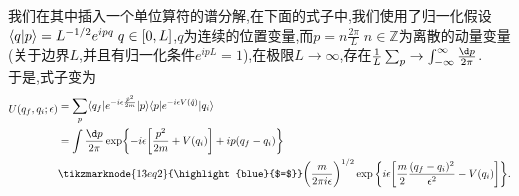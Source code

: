 我们在其中插入一个单位算符的谱分解,在下面的式子中,我们使用了归一化假设$\langle q|p\rangle=L^{-1/2}e^{ipq}\;q\in[0,L]$,$ q $为连续的位置变量,而$p=n\frac{2\pi}L\;n\in \mathbb Z$为离散的动量变量(关于边界$ L $,并且有归一化条件$e^{ipL}=1$),在极限$L\to\infty$,存在$\frac1L\sum_p\to\int_{-\infty}^\infty\frac{\d p}{2\pi}$.\\
于是,式子变为
\begin{equation}
    \vspace{\baselineskip}
    \begin{aligned}
        U(q_f,q_i;\epsilon)& \begin{aligned}&=\sum_p\langle q_f|e^{-i\epsilon\frac{\hat{p}^2}{2m}}|p\rangle\langle p|e^{-i\epsilon V(\hat{q})}|q_i\rangle\end{aligned} \\
        &=\int\frac{\d p}{2\pi}\exp\biggl\{-i\epsilon\biggl[\frac{p^2}{2m}+V(q_i)\biggr]+ip(q_f-q_i)\biggr\} \\
        &\tikzmarknode{13eq2}{\highlight{blue}{$=$}}\bigg(\frac{m}{2\pi i\epsilon}\bigg)^{1/2}\exp\bigg\{i\epsilon\bigg[\frac{m}{2}\frac{(q_{f}-q_{i})^{2}}{\epsilon^{2}}-V(q_{i})\bigg]\bigg\}.
    \end{aligned}
\end{equation}

